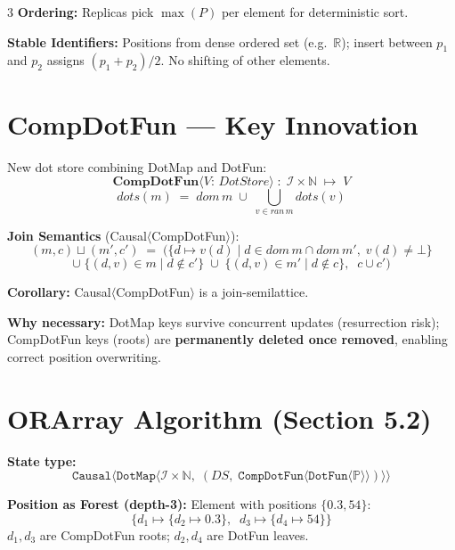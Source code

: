 \documentclass[a0,portrait]{a0poster}
\begin{document}
\begin{multicols}{3}
\textbf{Ordering:} Replicas pick $\max(P)$ per element for deterministic sort.

\textbf{Stable Identifiers:} Positions from dense ordered set (e.g.\ $\mathbb{R}$); insert between $p_1$ and $p_2$ assigns $(p_1+p_2)/2$. No shifting of other elements.


\section*{CompDotFun --- Key Innovation}

New dot store combining DotMap and DotFun:
\[
\textbf{CompDotFun}\langle V{:}\,DotStore\rangle \;:\; \mathcal{I} \times \mathbb{N} \;\mapsto\; V
\]
\[
dots(m) \;=\; dom\,m \;\cup\; \bigcup_{v \in ran\,m} dots(v)
\]

\textbf{Join Semantics} (Causal$\langle$CompDotFun$\rangle$):
\[
(m,c) \sqcup (m',c') \;=\; \Big(\{d \mapsto v(d) \mid d \in dom\,m \cap dom\,m',\;v(d)\neq\bot\}
\]
\[
\cup\;\{(d,v)\in m \mid d\notin c'\} \;\cup\; \{(d,v)\in m' \mid d\notin c\},\;\; c\cup c'\Big)
\]

\textbf{Corollary:} Causal$\langle$CompDotFun$\rangle$ is a join-semilattice.

\textbf{Why necessary:} DotMap keys survive concurrent updates (resurrection risk); CompDotFun keys (roots) are \textbf{permanently deleted once removed}, enabling correct position overwriting.


\section*{ORArray Algorithm (Section 5.2)}

\textbf{State type:}
\[
\mathtt{Causal}\Big\langle\mathtt{DotMap}\big\langle\mathcal{I}{\times}\mathbb{N},\;(DS,\;\mathtt{CompDotFun}\langle\mathtt{DotFun}\langle\mathbb{P}\rangle\rangle)\big\rangle\Big\rangle
\]

\textbf{Position as Forest (depth-3):} Element with positions $\{0.3, 54\}$:
\[
\{d_1 \mapsto \{d_2 \mapsto 0.3\},\;\; d_3 \mapsto \{d_4 \mapsto 54\}\}
\]
$d_1, d_3$ are CompDotFun roots; $d_2, d_4$ are DotFun leaves.


\end{multicols}
\end{document}
